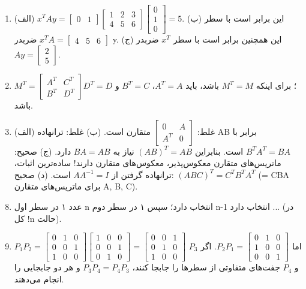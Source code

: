 \documentclass[12pt,a4paper]{article}
\begin{document}
{\begin{enumerate}
			\item (الف) $x^TAy = \begin{bmatrix} 0 & 1 \end{bmatrix} \begin{bmatrix} 1 & 2 & 3 \\ 4 & 5 & 6 \end{bmatrix} \begin{bmatrix} 0 \\ 1 \\ 0 \end{bmatrix} = 5$.
			(ب) این برابر است با سطر $x^TA = \begin{bmatrix} 4 & 5 & 6 \end{bmatrix}$ ضربدر y.
			(ج) این همچنین برابر است با سطر $x^T$ ضربدر $Ay = \begin{bmatrix} 2 \\ 5 \end{bmatrix}$.
			
			\item $M^T = \begin{bmatrix} A^T & C^T \\ B^T & D^T \end{bmatrix}$؛ برای اینکه $M^T=M$ باشد، باید $A^T=A$، $B^T=C$ و $D^T=D$ باشد.
			
			\item (الف) غلط: $\begin{bmatrix} 0 & A \\ A^T & 0 \end{bmatrix}$ متقارن است.
			(ب) غلط: ترانهاده AB برابر با $B^TA^T = BA$ است. بنابراین $(AB)^T=AB$ نیاز به $BA=AB$ دارد.
			(ج) صحیح: ماتریس‌های متقارن معکوس‌پذیر، معکوس‌های متقارن دارند! ساده‌ترین اثبات، ترانهاده گرفتن از $AA^{-1}=I$ است.
			(د) صحیح: $(ABC)^T = C^TB^TA^T$ (= CBA برای ماتریس‌های متقارن A, B, C).
		\end{enumerate}
		
		
		\begin{enumerate}
			\setcounter{enumi}{7}
			\item عدد ۱ در سطر اول n انتخاب دارد؛ سپس ۱ در سطر دوم n-1 انتخاب دارد ... (در کل !n حالت).
			
			\item $P_1P_2 = \begin{bmatrix} 0 & 1 & 0 \\ 0 & 0 & 1 \\ 1 & 0 & 0 \end{bmatrix} \begin{bmatrix} 1 & 0 & 0 \\ 0 & 0 & 1 \\ 0 & 1 & 0 \end{bmatrix} = \begin{bmatrix} 0 & 0 & 1 \\ 0 & 1 & 0 \\ 1 & 0 & 0 \end{bmatrix}$ اما $P_2P_1 = \begin{bmatrix} 0 & 1 & 0 \\ 1 & 0 & 0 \\ 0 & 0 & 1 \end{bmatrix}$.
			اگر $P_3$ و $P_4$ جفت‌های متفاوتی از سطرها را جابجا کنند، $P_3P_4=P_4P_3$ و هر دو جابجایی را انجام می‌دهند.
			

\end{enumerate}}
\end{document}
